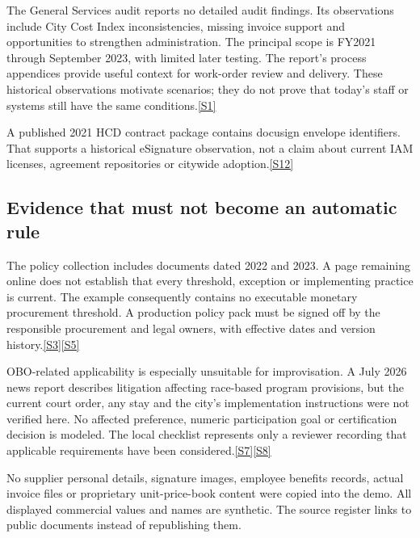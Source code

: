 \documentclass[11pt,letterpaper]{article}
\newcommand{\src}[1]{\hyperref[src:#1]{[#1]}}
\begin{document}
The General Services audit reports no detailed audit findings. Its observations include City Cost Index inconsistencies, missing invoice support and opportunities to strengthen administration. The principal scope is FY2021 through September 2023, with limited later testing. The report's process appendices provide useful context for work-order review and delivery. These historical observations motivate scenarios; they do not prove that today's staff or systems still have the same conditions.\src{S1}

A published 2021 HCD contract package contains docusign envelope identifiers. That supports a historical eSignature observation, not a claim about current IAM licenses, agreement repositories or citywide adoption.\src{S12}

\subsection{Evidence that must not become an automatic rule}
The policy collection includes documents dated 2022 and 2023. A page remaining online does not establish that every threshold, exception or implementing practice is current. The example consequently contains no executable monetary procurement threshold. A production policy pack must be signed off by the responsible procurement and legal owners, with effective dates and version history.\src{S3}\src{S5}

OBO-related applicability is especially unsuitable for improvisation. A July 2026 news report describes litigation affecting race-based program provisions, but the current court order, any stay and the city's implementation instructions were not verified here. No affected preference, numeric participation goal or certification decision is modeled. The local checklist represents only a reviewer recording that applicable requirements have been considered.\src{S7}\src{S8}

No supplier personal details, signature images, employee benefits records, actual invoice files or proprietary unit-price-book content were copied into the demo. All displayed commercial values and names are synthetic. The source register links to public documents instead of republishing them.
\end{document}
